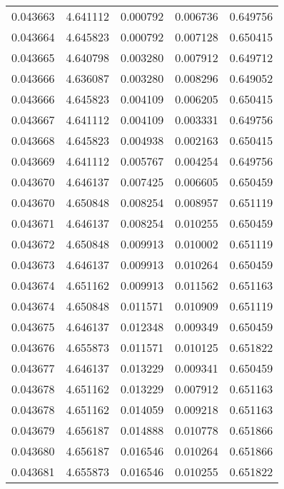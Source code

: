 \begin{tabular}{lrrrr}
0.043663    &  4.641112 &  0.000792 &  0.006736 &             0.649756 \\
0.043664    &  4.645823 &  0.000792 &  0.007128 &             0.650415 \\
0.043665    &  4.640798 &  0.003280 &  0.007912 &             0.649712 \\
0.043666    &  4.636087 &  0.003280 &  0.008296 &             0.649052 \\
0.043666    &  4.645823 &  0.004109 &  0.006205 &             0.650415 \\
0.043667    &  4.641112 &  0.004109 &  0.003331 &             0.649756 \\
0.043668    &  4.645823 &  0.004938 &  0.002163 &             0.650415 \\
0.043669    &  4.641112 &  0.005767 &  0.004254 &             0.649756 \\
0.043670    &  4.646137 &  0.007425 &  0.006605 &             0.650459 \\
0.043670    &  4.650848 &  0.008254 &  0.008957 &             0.651119 \\
0.043671    &  4.646137 &  0.008254 &  0.010255 &             0.650459 \\
0.043672    &  4.650848 &  0.009913 &  0.010002 &             0.651119 \\
0.043673    &  4.646137 &  0.009913 &  0.010264 &             0.650459 \\
0.043674    &  4.651162 &  0.009913 &  0.011562 &             0.651163 \\
0.043674    &  4.650848 &  0.011571 &  0.010909 &             0.651119 \\
0.043675    &  4.646137 &  0.012348 &  0.009349 &             0.650459 \\
0.043676    &  4.655873 &  0.011571 &  0.010125 &             0.651822 \\
0.043677    &  4.646137 &  0.013229 &  0.009341 &             0.650459 \\
0.043678    &  4.651162 &  0.013229 &  0.007912 &             0.651163 \\
0.043678    &  4.651162 &  0.014059 &  0.009218 &             0.651163 \\
0.043679    &  4.656187 &  0.014888 &  0.010778 &             0.651866 \\
0.043680    &  4.656187 &  0.016546 &  0.010264 &             0.651866 \\
0.043681    &  4.655873 &  0.016546 &  0.010255 &             0.651822 \\

\end{tabular}
